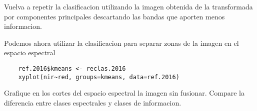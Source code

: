 \begin{act}
    Vuelva a repetir la clasificacion utilizando la imagen obtenida de la
    transformada por componentes principales descartando las bandas que aporten
    menos informacion.
\end{act}

Podemos ahora utilizar la clasificacion para separar zonas de la imagen en el
espacio espectral

\begin{lstlisting}
    ref.2016$kmeans <- reclas.2016
    xyplot(nir~red, groups=kmeans, data=ref.2016)
\end{lstlisting}

\begin{act}
    Grafique en los cortes del espacio espectral la imagen sin fusionar. Compare
    la diferencia entre clases espectrales y clases de informacion.
\end{act}

